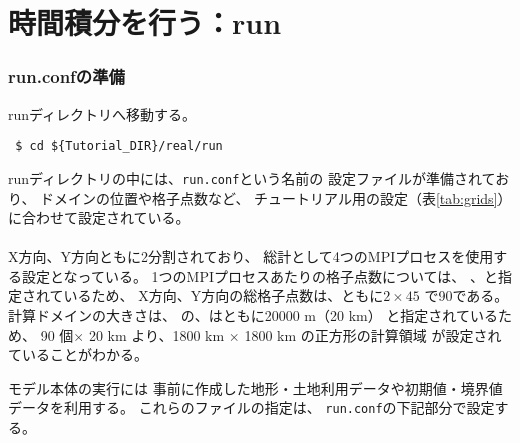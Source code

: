 \section{時間積分を行う：run}
\label{sec:tutrial_real_run}
\subsubsection{run.confの準備}
runディレクトリへ移動する。
\begin{verbatim}
 $ cd ${Tutorial_DIR}/real/run
\end{verbatim}
%
runディレクトリの中には、\verb|run.conf|という名前の
設定ファイルが準備されており、
ドメインの位置や格子点数など、
チュートリアル用の設定（表\ref{tab:grids}）に合わせて設定されている。\\

\\


X方向、Y方向ともに2分割されており、
総計として4つのMPIプロセスを使用する設定となっている。
1つのMPIプロセスあたりの格子点数については、
、と指定されているため、
X方向、Y方向の総格子点数は、ともに$2 \times 45$ で90である。
計算ドメインの大きさは、
の、はともに20000 m（20 km）
と指定されているため、
90 個$\times$ 20 km より、1800 km $\times$ 1800 km の正方形の計算領域
が設定されていることがわかる。


モデル本体の実行には
事前に作成した地形・土地利用データや初期値・境界値データを利用する。
これらのファイルの指定は、
\verb|run.conf|の下記部分で設定する。\\

